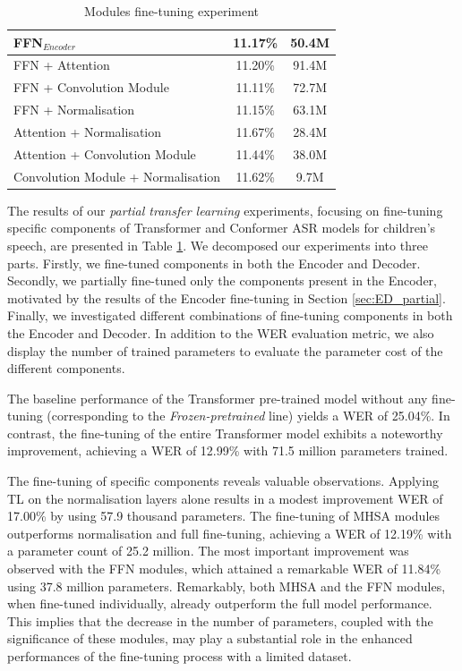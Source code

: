 \begin{table}
\begin{center}
\begin{tabular}{lcc}
            FFN$_{Encoder}$ & 11.17\% & 50.4M \\ \hline
            FFN + Attention & 11.20\% & 91.4M \\
            FFN + Convolution Module & 11.11\% & 72.7M \\
            FFN + Normalisation & 11.15\% & 63.1M \\
            Attention + Normalisation & 11.67\% & 28.4M \\
            Attention + Convolution Module & 11.44\% & 38.0M \\
            Convolution Module + Normalisation & 11.62\% & 9.7M\\ \hline
        \end{tabular}
    \end{center}
    \caption{Modules fine-tuning experiment}
    \label{table:ModulesTL}
\end{table}
The results of our \textit{partial transfer learning} experiments, focusing on fine-tuning specific components of Transformer and Conformer \ac{ASR} models for children's speech, are presented in Table \ref{table:ModulesTL}. We decomposed our experiments into three parts. Firstly, we fine-tuned components in both the Encoder and Decoder. Secondly, we partially fine-tuned only the components present in the Encoder, motivated by the results of the Encoder fine-tuning in Section \ref{sec:ED_partial}. Finally, we investigated different combinations of fine-tuning components in both the Encoder and Decoder. In addition to the \ac{WER} evaluation metric, we also display the number of trained parameters to evaluate the parameter cost of the different components. 

The baseline performance of the Transformer pre-trained model without any fine-tuning (corresponding to the \textit{Frozen-pretrained} line) yields a \ac{WER} of 25.04\%. In contrast, the fine-tuning of the entire Transformer model exhibits a noteworthy improvement, achieving a \ac{WER} of 12.99\% with 71.5 million parameters trained.

The fine-tuning of specific components reveals valuable observations. Applying \ac{TL} on the normalisation layers alone results in a modest improvement \ac{WER} of 17.00\% by using 57.9 thousand parameters. The fine-tuning of \ac{MHSA} modules outperforms normalisation and full fine-tuning, achieving a \ac{WER} of 12.19\% with a parameter count of 25.2 million. The most important improvement was observed with the \ac{FFN} modules, which attained a remarkable \ac{WER} of 11.84\% using 37.8 million parameters. Remarkably, both \ac{MHSA} and the \ac{FFN} modules, when fine-tuned individually, already outperform the full model performance. This implies that the decrease in the number of parameters, coupled with the significance of these modules, may play a substantial role in the enhanced performances of the fine-tuning process with a limited dataset.


